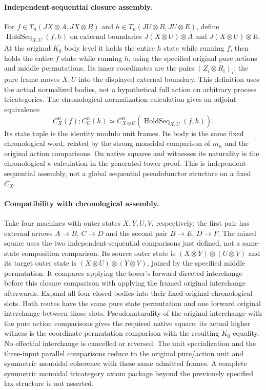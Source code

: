 \documentclass{article}
\begin{document}
\paragraph{Independent-sequential closure assembly.}
For $f\in T_n(JX\otimes A,JX\otimes B)$ and
$h\in T_n(JU\otimes B,JU\otimes E)$, define
$\operatorname{HoldSeq}_{X,U}(f,h)$ on external boundaries
$J(X\otimes U)\otimes A$ and $J(X\otimes U)\otimes E$.
At the original $K_0$ body level it holds the entire $h$ state while running $f$, then holds the entire $f$ state while running $h$, using the specified original pure actions and middle permutations. Its inner coordinates are the pairs $(Z_i\otimes R_i)_i$; the pure frame moves $X,U$ into the displayed external boundary. This definition uses the actual normalized bodies, not a hypothetical full action on arbitrary process tricategories. The chronological normalization calculation gives an adjoint equivalence
\[
 C_X^n(f);C_U^n(h)
 \simeq C_{X\otimes U}^n(\operatorname{HoldSeq}_{X,U}(f,h)).
\]
Its state tuple is the identity modulo unit frames. Its body is the same fixed chronological word, related by the strong monoidal comparison of $m_n$ and the original action comparisons. On native squares and witnesses its naturality is the chronological $\kappa$ calculation in the generated-tower proof. This is independent-sequential assembly, not a global sequential pseudofunctor structure on a fixed $C_X$.

\paragraph{Compatibility with chronological assembly.} Take four machines with outer states $X,Y,U,V$, respectively: the first pair has external arrows $A\to B$, $C\to D$ and the second pair $B\to E$, $D\to F$. The mixed square uses the two independent-sequential comparisons just defined, not a same-state composition comparison. Its source outer state is $(X\otimes Y)\otimes(U\otimes V)$ and its target outer state is $(X\otimes U)\otimes(Y\otimes V)$, joined by the specified middle permutation. It compares applying the tower's forward directed interchange before this closure comparison with applying the framed original interchange afterwards. Expand all four closed bodies into their fixed original chronological slots. Both routes have the same pure state permutation and one forward original interchange between those slots. Pseudonaturality of the original interchange with the pure action comparisons gives the required native square; its actual higher witness is the coordinate permutation comparison with the resulting $K_0$ equality. No effectful interchange is cancelled or reversed. The unit specialization and the three-input parallel comparisons reduce to the original pure/action unit and symmetric monoidal coherence with these same admitted frames. A complete symmetric monoidal tricategory axiom package beyond the previously specified lax structure is not asserted.
\end{document}
